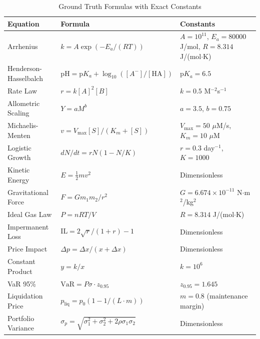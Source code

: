 \documentclass[twoside,11pt]{article}
\begin{document}
\begin{table}[H]
\centering
\caption{Ground Truth Formulas with Exact Constants}
\label{tab:formulas_detailed}
\scriptsize
\begin{tabular}{lll}
\toprule
\textbf{Equation} & \textbf{Formula} & \textbf{Constants} \\
\midrule
Arrhenius & $k = A\exp(-E_a/(RT))$ & $A=10^{11}$, $E_a=80000$ J/mol, $R=8.314$ J/(mol$\cdot$K) \\
Henderson-Hasselbalch & $\text{pH} = \text{p}K_a + \log_{10}([A^-]/[\text{HA}])$ & $\text{p}K_a = 6.5$ \\
Rate Law & $r = k[A]^2[B]$ & $k = 0.5$ M$^{-2}$s$^{-1}$ \\
Allometric Scaling & $Y = aM^b$ & $a = 3.5$, $b = 0.75$ \\
Michaelis-Menten & $v = V_{\max}[S]/(K_m + [S])$ & $V_{\max} = 50$ $\mu$M/s, $K_m = 10$ $\mu$M \\
Logistic Growth & $dN/dt = rN(1-N/K)$ & $r = 0.3$ day$^{-1}$, $K = 1000$ \\
Kinetic Energy & $E = \frac{1}{2}mv^2$ & Dimensionless \\
Gravitational Force & $F = Gm_1m_2/r^2$ & $G = 6.674 \times 10^{-11}$ N$\cdot$m$^2$/kg$^2$ \\
Ideal Gas Law & $P = nRT/V$ & $R = 8.314$ J/(mol$\cdot$K) \\
Impermanent Loss & $\text{IL} = 2\sqrt{r}/(1+r) - 1$ & Dimensionless \\
Price Impact & $\Delta p = \Delta x/(x + \Delta x)$ & Dimensionless \\
Constant Product & $y = k/x$ & $k = 10^6$ \\
VaR 95\% & $\text{VaR} = P\sigma \cdot z_{0.95}$ & $z_{0.95} = 1.645$ \\
Liquidation Price & $p_{\text{liq}} = p_0(1 - 1/(L \cdot m))$ & $m = 0.8$ (maintenance margin) \\
Portfolio Variance & $\sigma_p = \sqrt{\sigma_1^2 + \sigma_2^2 + 2\rho\sigma_1\sigma_2}$ & Dimensionless \\
\bottomrule
\end{tabular}
\end{table}
\end{document}
